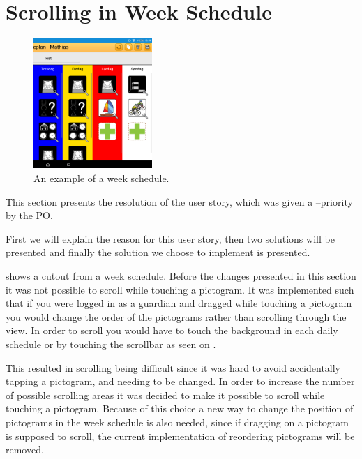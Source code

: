 \section{Scrolling in Week Schedule}

\begin{figure} 
    \centering
        \includegraphics[width=0.4\textwidth]{figures/img/screenshots/weekplan_schedule.png}
    \caption{An example of a week schedule.}
    \label{fig:weekschedule}
    \vspace{-20pt}
\end{figure}

This section presents the resolution of the user story, which was given a \phigh--priority by the PO.

First we will explain the reason for this user story, then two solutions will be presented and finally the solution we choose to implement is presented. 

 shows a cutout from a week schedule. 
Before the changes presented in this section it was not possible to scroll while touching a pictogram. 
It was implemented such that if you were logged in as a guardian and dragged while touching a pictogram you would change the order of the pictograms rather than scrolling through the view.
In order to scroll you would have to touch the background in each daily schedule or by touching the scrollbar as seen on .

This resulted in scrolling being difficult since it was hard to avoid accidentally tapping a pictogram, and needing to be changed.
In order to increase the number of possible scrolling areas it was decided to make it possible to scroll while touching a pictogram.
Because of this choice a new way to change the position of pictograms in the week schedule is also needed, since if dragging on a pictogram is supposed to scroll, the current implementation of reordering pictograms will be removed.

